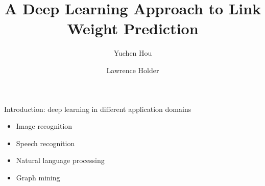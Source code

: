 \documentclass{beamer}
\title{A Deep Learning Approach to Link Weight Prediction}
\author{Yuchen Hou \and Lawrence Holder}
\date{}
\begin{document}

\begin{frame}{Introduction: deep learning in different application domains}
	\begin{itemize}
		\item Image recognition
		\item Speech recognition
		\item Natural language processing
		\item Graph mining
	\end{itemize}
\end{frame}
\end{document}

